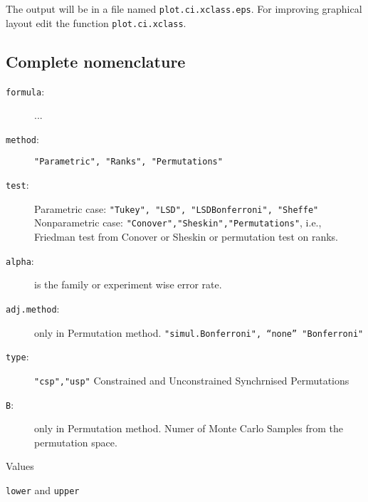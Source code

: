 \documentclass[a4paper,11pt]{article}
\begin{document}
The output will be in a file named \texttt{plot.ci.xclass.eps}. For
improving graphical layout edit the function \texttt{plot.ci.xclass}.



\subsection{Complete nomenclature}

\begin{description}
\item[\texttt{formula}:] ...
\item[\texttt{method}:] \texttt{"Parametric", "Ranks", "Permutations"}
\item[\texttt{test}:] Parametric case: \texttt{"Tukey", "LSD",
    "LSDBonferroni", "Sheffe"}\\ Nonparametric case:
  \texttt{"Conover","Sheskin","Permutations"}, i.e.,  Friedman test from
  Conover or Sheskin or permutation test on ranks.
\item[\texttt{alpha}:] is the family or experiment wise error rate. 
\item[\texttt{adj.method}:] only in Permutation method.
  \texttt{"simul.Bonferroni", ``none'' "Bonferroni"}
\item[\texttt{type}:] \texttt{"csp","usp"} Constrained and Unconstrained
  Synchrnised Permutations
\item[\texttt{B}:] only in Permutation method. Numer of Monte Carlo
  Samples from the permutation space.
\end{description}

\medskip
Values 
\begin{description}
\item \texttt{lower} and \texttt{upper}
\end{description}

    
\end{document}
